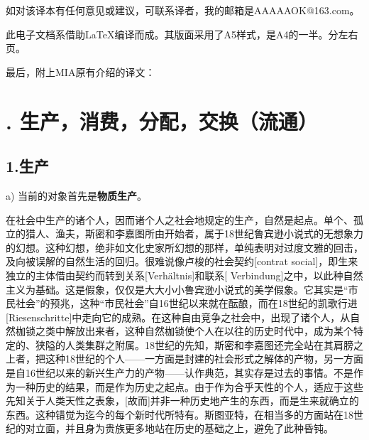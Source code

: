 \documentclass[a4paper,twoside,12pt]{ctexart}
\begin{document}
如对该译本有任何意见或建议，可联系译者，我的邮箱是AAAAAOK@163.com。

此电子文档系借助\LaTeX 编译而成。其版面采用了A5样式，是A4的一半。分左右页。

最后，附上MIA原有介绍的译文：


\begin{adjustwidth}{2em}{2em}
\end{adjustwidth}


\newpage


\section{\uppercase\expandafter{}. 生产，消费，分配，交换（流通）}

\subsection{1.生产}

a) 当前的对象首先是\textbf{物质生产}。

在社会中生产的诸个人，因而诸个人之社会地规定的生产，自然是起点。单个、孤立的猎人、渔夫，斯密和李嘉图所由开始者，属于18世纪鲁宾逊小说式的无想象力的幻想。这种幻想，绝非如文化史家所幻想的那样，单纯表明对过度文雅的回击，及向被误解的自然生活的回归。很难说像卢梭的社会契约[contrat social]，即生来独立的主体借由契约而转到关系[Verhältnis]和联系[ Verbindung]之中，以此种自然主义为基础。这是假象，仅仅是大大小小鲁宾逊小说式的美学假象。它其实是“市民社会”的预兆，这种“市民社会”自16世纪以来就在酝酿，而在18世纪的凯歌行进[Riesenschritte]中走向它的成熟。在这种自由竞争之社会中，出现了诸个人，从自然枷锁之类中解放出来者，这种自然枷锁使个人在以往的历史时代中，成为某个特定的、狭隘的人类集群之附属。18世纪的先知，斯密和李嘉图还完全站在其肩膀之上者，把这种18世纪的个人——一方面是封建的社会形式之解体的产物，另一方面是自16世纪以来的新兴生产力的产物——认作典范，其实存是过去的事情。不是作为一种历史的结果，而是作为历史之起点。由于作为合乎天性的个人，适应于这些先知关于人类天性之表象，[故而]并非一种历史地产生的东西，而是生来就确立的东西。这种错觉为迄今的每个新时代所特有。斯图亚特，在相当多的方面站在18世纪的对立面，并且身为贵族更多地站在历史的基础之上，避免了此种昏钝。
\end{document}
